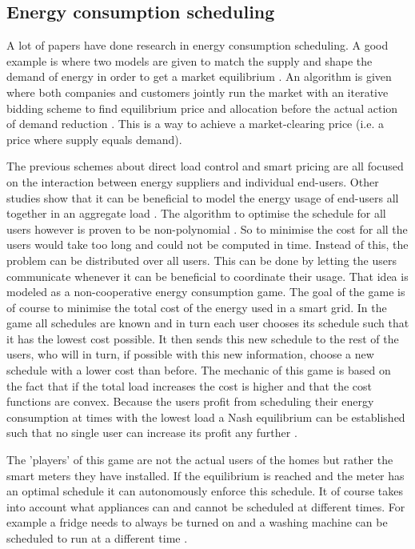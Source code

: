 \subsection{Energy consumption scheduling}
A lot of papers have done research in energy consumption scheduling. A good example is where two models are given to match the supply and shape the demand of energy in order to get a market equilibrium \cite{ChenLiLowEtAl2010}. An algorithm is given where both companies and customers jointly run the market with an iterative bidding scheme to find equilibrium price and allocation before the actual action of demand reduction \cite{ChenLiLowEtAl2010}. This is a way to achieve a market-clearing price (i.e. a price where supply equals demand).

The previous schemes about direct load control and smart pricing are all focused on the interaction between energy suppliers and individual end-users. Other studies show that it can be beneficial to model the energy usage of end-users all together in an aggregate load \cite{Mohsenian-RadWongJatskevichEtAl2010a, SalinasLiLi2013, ZhuTangLambotharanEtAl2011}. The algorithm to optimise the schedule for all users however is proven to be non-polynomial \cite{CaronKesidis2010}. So to minimise the cost for all the users would take too long and could not be computed in time. Instead of this, the problem can be distributed over all users. This can be done by letting the users communicate whenever it can be beneficial to coordinate their usage. That idea is modeled as a non-cooperative energy consumption game. The goal of the game is of course to minimise the total cost of the energy used in a smart grid. In the game all schedules are known and in turn each user chooses its schedule such that it has the lowest cost possible. It then sends this new schedule to the rest of the users, who will in turn, if possible with this new information, choose a new schedule with a lower cost than before. The mechanic of this game is based on the fact that if the total load increases the cost is higher and that the cost functions are convex. Because the users profit from scheduling their energy consumption at times with the lowest load a Nash equilibrium can be established such that no single user can increase its profit any further \cite{Mohsenian-RadWongJatskevichEtAl2010a, ZhuTangLambotharanEtAl2011}.

The 'players' of this game are not the actual users of the homes but rather the smart meters they have installed. If the equilibrium is reached and the meter has an optimal schedule it can autonomously enforce this schedule. It of course takes into account what appliances can and cannot be scheduled at different times. For example a fridge needs to always be turned on and a washing machine can be scheduled to run at a different time \cite{DepuruWangDevabhaktuni2011a}. 
